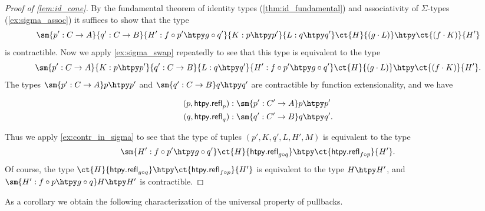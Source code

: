 \begin{proof}[Proof of \cref{lem:id_cone}]
By the fundamental theorem of identity types (\cref{thm:id_fundamental}) and associativity of $\Sigma$-types (\cref{ex:sigma_assoc}) it suffices to show that the type
\begin{equation*}
\sm{p':C\to A}{q':C\to B}{H':f\circ p'\htpy g\circ q'}{K:p\htpy p'}{L:q\htpy q'} \ct{H}{(g\cdot L)} \htpy \ct{(f\cdot K)}{H'}
\end{equation*}
is contractible. Now we apply \cref{ex:sigma_swap} repeatedly to see that this type is equivalent to the type
\begin{equation*}
\sm{p':C\to A}{K: p\htpy p'}{q':C\to B}{L: q\htpy q'}{H':f\circ p'\htpy g\circ q'} \ct{H}{(g\cdot L)} \htpy \ct{(f\cdot K)}{H'}.
\end{equation*}
The types $\sm{p':C\to A} p\htpy p'$ and $\sm{q':C\to B} q\htpy q'$ are contractible by function extensionality, and  we have
\begin{samepage}
\begin{align*}
(p,\mathsf{htpy.refl}_p) & : \sm{p':C'\to A} p\htpy p' \\
(q,\mathsf{htpy.refl}_q) & : \sm{q':C'\to B} q\htpy q'.
\end{align*}%
\end{samepage}%
Thus we apply \cref{ex:contr_in_sigma} to see that the type of tuples $(p',K,q',L,H',M)$ is equivalent to the type
\begin{equation*}
\sm{H':f\circ p'\htpy g\circ q'} \ct{H}{\mathsf{htpy.refl}_{g\circ q}}\htpy \ct{\mathsf{htpy.refl}_{f\circ p}}{H'}.
\end{equation*}
Of course, the type $\ct{H}{\mathsf{htpy.refl}_{g\circ q}}\htpy \ct{\mathsf{htpy.refl}_{f\circ p}}{H'}$ is equivalent to the type $H\htpy H'$, and $\sm{H':f\circ p\htpy g\circ q} H\htpy H'$ is contractible.
\end{proof}

As a corollary we obtain the following characterization of the universal property of pullbacks.


